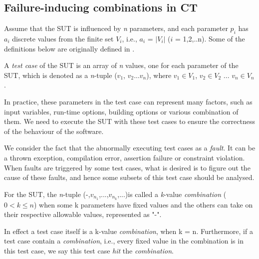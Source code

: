 \documentclass{sig-alternate}
\begin{document}
\subsection{Failure-inducing combinations in CT}

Assume that the SUT is influenced by \emph{n} parameters, and each parameter $p_{i}$ has $a_{i}$ discrete values from the finite set $V_{i}$, i.e., $a_{i}$ = $|V_{i}|$ ($i$ = 1,2,..n). Some of the definitions below are originally defined in \cite{nie2011survey}.

\begin{definition}
A \emph{test case} of the SUT is an array of \emph{n} values, one for each parameter of the SUT, which is denoted as a \emph{n}-tuple ($v_{1}$, $v_{2}$...$v_{n}$), where $v_{1}\in V_{1}$, $v_{2} \in V_{2}$ ... $v_{n} \in V_{n}$.
\end{definition}

In practice, these parameters in the test case can represent many factors, such as input variables, run-time options, building options or various combination of them. We need to execute the SUT with these test cases to ensure the correctness of the behaviour of the software.

We consider the fact that the abnormally executing test cases as a \emph{fault}. It can be a thrown exception, compilation error, assertion failure or constraint violation. When faults are triggered by some test cases, what is desired is to figure out the cause of these faults, and hence some subsets of this test case should be analysed.



\begin{definition}
For the SUT, the \emph{n}-tuple (-,$v_{n_{1}}$,...,$v_{n_{k}}$,...)is called a \emph{k}-value \emph{combination} ($0 < k \leq n $) when some k parameters have fixed values and the others can take on their respective allowable values, represented as "-".

In effect a test case itself is a k-value \emph{combination}, when k = n. Furthermore, if a test case contain a \emph{combination}, i.e., every fixed value in the combination is in this test case, we say this test case \emph{hit} the \emph{combination}.
\end{definition}
\end{document}
